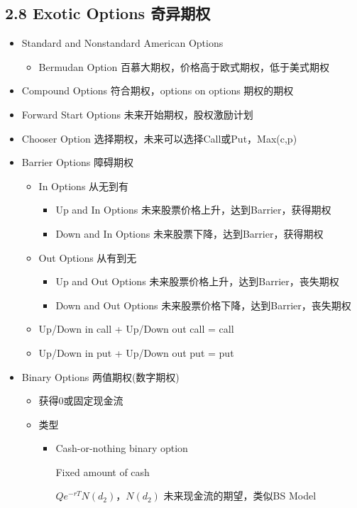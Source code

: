 \documentclass[a4paper,6pt,twoside,openany]{article}
\begin{document}
\subsection*{2.8 Exotic Options 奇异期权}
\begin{itemize}
  \item Standard and Nonstandard American Options
    \begin{itemize}
    \item Bermudan Option 百慕大期权，价格高于欧式期权，低于美式期权
    \end{itemize}
  \item Compound Options 符合期权，options on options 期权的期权
  \item  Forward Start Options 未来开始期权，股权激励计划
  \item Chooser Option 选择期权，未来可以选择Call或Put，Max(c,p)
  \item Barrier Options 障碍期权
    \begin{itemize}
    \item In Options 从无到有
      \begin{itemize}
      \item Up and In Options 未来股票价格上升，达到Barrier，获得期权
      \item Down and In Options 未来股票下降，达到Barrier，获得期权
      \end{itemize}
    \item Out Options 从有到无
      \begin{itemize}
      \item Up and Out Options 未来股票价格上升，达到Barrier，丧失期权
      \item Down and Out Options 未来股票价格下降，达到Barrier，丧失期权
      \end{itemize}
    \item Up/Down in call + Up/Down out call = call
    \item Up/Down in put + Up/Down out put = put
    \end{itemize}
  \item Binary Options 两值期权(数字期权)
    \begin{itemize}
    \item 获得0或固定现金流
    \item 类型
      \begin{itemize}
      \item Cash-or-nothing binary option
        \par Fixed amount of cash
        \par $Qe^{-rT}N(d_2)$，$N(d_2)$ 未来现金流的期望，类似BS Model

\end{itemize}
\end{itemize}
\end{itemize}
\end{document}
